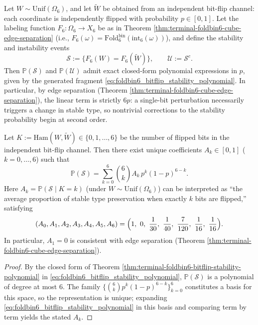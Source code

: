 \begin{theorem}\label{thm:terminal-foldbin6-bitflip-stability-polynomial}
Let \(W\sim\mathrm{Unif}(\Omega_6)\), and let \(\widetilde W\) be obtained from an independent bit-flip channel: each coordinate is independently flipped with probability \(p\in[0,1]\).
Let the labeling function \(F_6:\Omega_6\to X_6\) be as in Theorem \ref{thm:terminal-foldbin6-cube-edge-separation} (i.e., \(F_6(\omega)=\mathrm{Fold}^{\mathrm{bin}}_6(\mathrm{int}_6(\omega))\)), and define the stability and instability events
\[
\mathcal S:=\{F_6(W)=F_6(\widetilde W)\},
\qquad
\mathcal U:=\mathcal S^c.
\]
Then \(\mathbb{P}(\mathcal S)\) and \(\mathbb{P}(\mathcal U)\) admit exact closed-form polynomial expressions in \(p\), given by the generated fragment \eqref{eq:foldbin6_bitflip_stability_polynomial}.
In particular, by edge separation (Theorem \ref{thm:terminal-foldbin6-cube-edge-separation}), the linear term is strictly \(6p\): a single-bit perturbation necessarily triggers a change in stable type, so nontrivial corrections to the stability probability begin at second order.
\end{theorem}


\begin{corollary}\label{cor:terminal-foldbin6-bitflip-stability-Ak}
Let \(K:=\mathrm{Ham}(W,\widetilde W)\in\{0,1,\dots,6\}\) be the number of flipped bits in the independent bit-flip channel.
Then there exist unique coefficients \(A_k\in[0,1]\) (\(k=0,\dots,6\)) such that
\[
\mathbb{P}(\mathcal S)=\sum_{k=0}^{6}\binom{6}{k}A_k\,p^{k}(1-p)^{6-k}.
\]
Here \(A_k=\mathbb{P}(\mathcal S\mid K=k)\) (under \(W\sim\mathrm{Unif}(\Omega_6)\)) can be interpreted as ``the average proportion of stable type preservation when exactly \(k\) bits are flipped,'' satisfying
\[
(A_0,A_1,A_2,A_3,A_4,A_5,A_6)=\Bigl(1,\ 0,\ \frac{1}{30},\ \frac{1}{40},\ \frac{7}{120},\ \frac{1}{16},\ \frac{1}{16}\Bigr).
\]
In particular, \(A_1=0\) is consistent with edge separation (Theorem \ref{thm:terminal-foldbin6-cube-edge-separation}).
\end{corollary}
\begin{proof}
By the closed form of Theorem \ref{thm:terminal-foldbin6-bitflip-stability-polynomial} in \eqref{eq:foldbin6_bitflip_stability_polynomial},
\(\mathbb{P}(\mathcal S)\) is a polynomial of degree at most \(6\).
The family \(\{\binom{6}{k}p^k(1-p)^{6-k}\}_{k=0}^6\) constitutes a basis for this space,
so the representation is unique; expanding \eqref{eq:foldbin6_bitflip_stability_polynomial} in this basis and comparing term by term yields the stated \(A_k\).
\end{proof}

